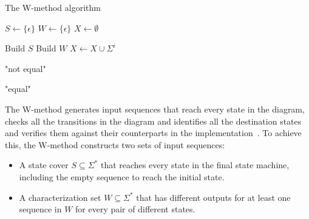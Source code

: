 \begin{algorithm}[h]
\caption{The W-method algorithm}
\label{alg:w-method}
\begin{algorithmic}[1]
 
\State $S \gets \{ \epsilon \}$ 
\State $W \gets \{ \epsilon \}$ 
\State $X \gets \emptyset$ 

\State Build $S$ 
\State Build $W$ 
 
\State $X \gets X \cup \Sigma^{i}$ 
\EndFor

\State \Return "not equal"
\EndIf
\State {} 
\EndFor
\EndFor
\EndFor

\State \Return "equal"

\EndFunction{}
\end{algorithmic}
\end{algorithm}

The W-method generates input sequences that reach every state in the
diagram, checks all the transitions in the diagram and identifies all the
destination states and verifies them against their counterparts in
the implementation~\cite{Ipate2007}.
To achieve this, the W-method constructs two sets of input sequences:
\begin{itemize}
  \item A state cover $S \subseteq \Sigma^{*}$ that reaches every state in the
    final state machine, including the empty sequence to reach the initial state.
  \item A characterization set $W \subseteq \Sigma^{*}$ that has different
    outputs for at least one sequence in $W$ for every pair of different states.
\end{itemize}

